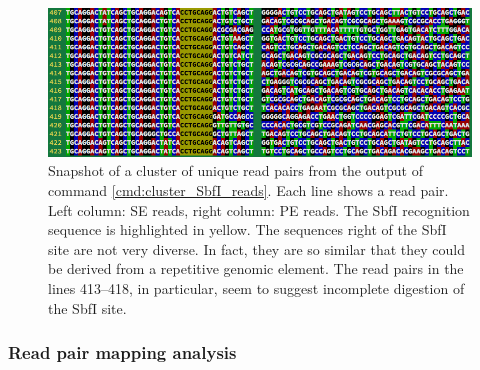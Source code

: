 \documentclass[a4paper,12pt,times,print,index,custombib,custommargin]{PhDThesisPSnPDF}\usepackage[]{graphicx}\usepackage[]{color}
\begin{document}
%
\begin{figure}
\centering
\includegraphics[width=.95\textwidth]{stRAD_all_uniq_SbfI_reads_clustered_2}
\caption{Snapshot of a cluster of unique read pairs from the output of command \ref{cmd:cluster_SbfI_reads}. Each line shows a read pair. Left column: SE reads, right column: PE reads. The SbfI recognition sequence is highlighted in yellow. The sequences right of the SbfI site are not very diverse. In fact, they are so similar that they could be derived from a repetitive genomic element. The read pairs in the lines 413--418, in particular, seem to suggest incomplete digestion of the SbfI site.}
\label{stRAD_all_uniq_SbfI_reads_clustered_2}
\end{figure}

\FloatBarrier
\subsubsection{Read pair mapping analysis}
\end{document}
